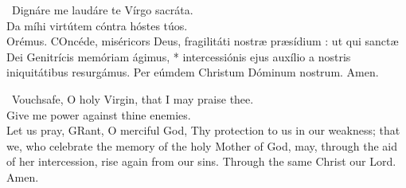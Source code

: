 \documentclass[11pt]{extarticle} %
\begin{document}
\setlength{\columnsep}{18pt}
\setlength{\columnseprule}{1pt}
\begin{multicols}{2}
\noindent\Vbar{}~Dignáre me laudáre te Vírgo sacráta.
\\
\Rbar Da míhi virtútem cóntra hóstes túos.\\

\noindent\hspace*{3em}Orémus.
\lettrine{C}Oncéde, miséricors Deus, fragilitáti nostræ præsídium : \gredagger{} ut qui sanctæ Dei Genitrícis memóriam ágimus, * intercessiónis ejus auxílio a nostris iniquitátibus resurgámus. Per eúmdem Christum Dóminum nostrum. \Rbar Amen. %
\columnbreak

\noindent\Vbar{}~Vouchsafe, O holy Virgin, that I may praise thee.\\
\Rbar Give me power against thine enemies.\\

\noindent\hspace*{3em}Let us pray,
\noindent{}\lettrine{G}Rant, O merciful God, Thy protection to us in our weakness; that we, who celebrate the memory of the holy Mother of God, may, through the aid of her intercession, rise again from our sins. Through the same Christ our Lord. \Rbar Amen. %
\end{multicols}
\end{document}
